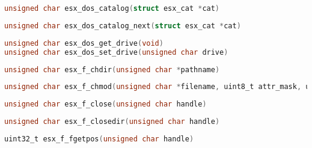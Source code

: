 \documentclass[11pt]{book}
\def\lthtmlcheckvsize{\ifdim\ht\sizebox<\vsize 
  \ifdim\wd\sizebox<\hsize\expandafter\hfill\fi \expandafter\vfill
  \else\expandafter\vss\fi}%
\begin{document}
{\newpage\clearpage
{}%
\begin{lstlisting}[language=C]
unsigned char esx_dos_catalog(struct esx_cat *cat)
\end{lstlisting}%
\lthtmlfigureZ
\lthtmlcheckvsize\clearpage}

{\newpage\clearpage
{}%
\begin{lstlisting}[language=C]
unsigned char esx_dos_catalog_next(struct esx_cat *cat)
\end{lstlisting}%
\lthtmlfigureZ
\lthtmlcheckvsize\clearpage}

{\newpage\clearpage
{}%
\begin{lstlisting}[language=C]
unsigned char esx_dos_get_drive(void)
unsigned char esx_dos_set_drive(unsigned char drive)
\end{lstlisting}%
\lthtmlfigureZ
\lthtmlcheckvsize\clearpage}

{\newpage\clearpage
{}%
\begin{lstlisting}[language=C]
unsigned char esx_f_chdir(unsigned char *pathname)
\end{lstlisting}%
\lthtmlfigureZ
\lthtmlcheckvsize\clearpage}

{\newpage\clearpage
{}%
\begin{lstlisting}[language=C]
unsigned char esx_f_chmod(unsigned char *filename, uint8_t attr_mask, uint8_t attr)
\end{lstlisting}%
\lthtmlfigureZ
\lthtmlcheckvsize\clearpage}

{\newpage\clearpage
{}%
\begin{lstlisting}[language=C]
unsigned char esx_f_close(unsigned char handle)
\end{lstlisting}%
\lthtmlfigureZ
\lthtmlcheckvsize\clearpage}

{\newpage\clearpage
{}%
\begin{lstlisting}[language=C]
unsigned char esx_f_closedir(unsigned char handle)
\end{lstlisting}%
\lthtmlfigureZ
\lthtmlcheckvsize\clearpage}

{\newpage\clearpage
{}%
\begin{lstlisting}[language=C]
uint32_t esx_f_fgetpos(unsigned char handle)
\end{lstlisting}%
\lthtmlfigureZ
\lthtmlcheckvsize\clearpage}
\end{document}
